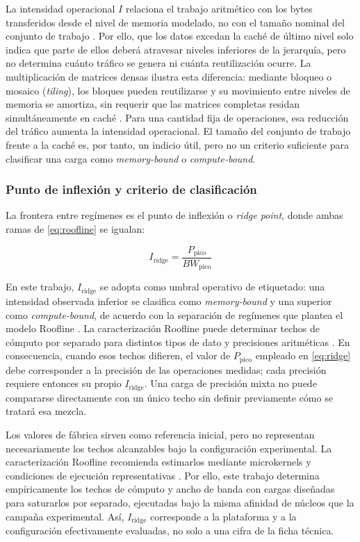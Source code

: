 \documentclass[12pt,oneside,spanish]{book}
\begin{document}
La intensidad operacional $I$ relaciona el trabajo aritmético con los
bytes transferidos desde el nivel de memoria modelado, no con el tamaño
nominal del conjunto de trabajo \cite[p.~66]{Williams2009}. Por ello, que
los datos excedan la caché de último nivel solo indica que parte de ellos
deberá atravesar niveles inferiores de la jerarquía, pero no determina
cuánto tráfico se genera ni cuánta reutilización ocurre. La multiplicación
de matrices densas ilustra esta diferencia: mediante bloqueo o mosaico
(\textit{tiling}), los bloques pueden reutilizarse y su movimiento entre
niveles de memoria se amortiza, sin requerir que las matrices completas
residan simultáneamente en caché \cite[Secs.~3--4]{Goto2008}. Para una
cantidad fija de operaciones, esa reducción del tráfico aumenta la
intensidad operacional. El tamaño del conjunto de trabajo frente a la
caché es, por tanto, un indicio útil, pero no un criterio suficiente para
clasificar una carga como \textit{memory-bound} o \textit{compute-bound}.

\subsubsection{Punto de inflexión y criterio de clasificación}

La frontera entre regímenes es el punto de inflexión o \textit{ridge point}, donde ambas ramas de \eqref{eq:roofline} se igualan:

\begin{equation}
I_{\text{ridge}} = \frac{P_{\text{pico}}}{BW_{\text{pico}}}
\label{eq:ridge}
\end{equation}

En este trabajo, $I_{\text{ridge}}$ se adopta como umbral operativo de
etiquetado: una intensidad observada inferior se clasifica como
\textit{memory-bound} y una superior como \textit{compute-bound}, de
acuerdo con la separación de regímenes que plantea el modelo Roofline
\cite{Williams2009}. La caracterización Roofline puede determinar techos
de cómputo por separado para distintos tipos de dato y precisiones
aritméticas \cite{Antepara2025}. En consecuencia, cuando esos techos
difieren, el valor de $P_{\text{pico}}$ empleado en
\eqref{eq:ridge} debe corresponder a la precisión de las operaciones
medidas; cada precisión requiere entonces su propio
$I_{\text{ridge}}$. Una carga de precisión mixta no puede compararse
directamente con un único techo sin definir previamente cómo se tratará
esa mezcla.

Los valores de fábrica sirven como referencia inicial, pero no representan
necesariamente los techos alcanzables bajo la configuración experimental.
La caracterización Roofline recomienda estimarlos mediante microkernels y
condiciones de ejecución representativas \cite{NERSC2026}. Por ello, este
trabajo determina empíricamente los techos de cómputo y ancho de banda con
cargas diseñadas para saturarlos por separado, ejecutadas bajo la misma
afinidad de núcleos que la campaña experimental. Así,
$I_{\text{ridge}}$ corresponde a la plataforma y a la configuración
efectivamente evaluadas, no solo a una cifra de la ficha técnica.
\end{document}
